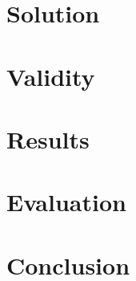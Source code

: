 \documentclass[12pt,a4paper]{article}
\begin{document}
    \section{Solution}\label{sec:solution}
    

    \section{Validity}\label{sec:validity}
    

    \section{Results}\label{sec:results}
    

    \section{Evaluation}\label{sec:evaluation}
    

    \section{Conclusion}\label{sec:conculsion}
    


    {\footnotesize
    }
\end{document}
